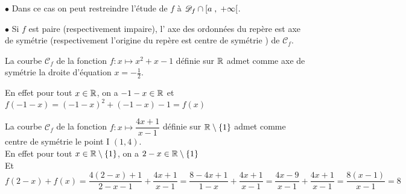 \begin{remark}

$ \bullet $  Dans ce cas on peut restreindre l'étude de $ f $  à $ \mathscr{D}_{f}\cap \left[a \;,\; +\infty\right[ $.

$ \bullet $ Si $ f $  est paire (respectivement impaire), l' axe des ordonnées du repère est  axe de symétrie (respectivement l'origine du repère est centre de symétrie ) de $  \mathscr{C}_{f}$.
\end{remark}
\begin{example}

 La  courbe  $  \mathscr{C}_{f}$ de la  fonction $ f : x\longmapsto x^{2}+x-1 $  définie sur $ \mathbb{R} $  admet comme axe de symétrie la droite d'équation $ x=-\frac{1}{2} $.
 
 En effet pour tout $ x\in\mathbb{R} $, on a $ -1-x\in\mathbb{R} $  et $ f(-1-x)= (-1-x)^{2}+(-1-x)-1=f(x) $


\end{example}

\begin{example} 

 La  courbe  $  \mathscr{C}_{f}$ de la  fonction $ f :x\longmapsto \dfrac{4x+1}{x-1} $ \;  définie sur $ \mathbb{R}\setminus \left\{1\right\} $  admet comme centre de symétrie le point  I $ (1,4) $.\\
 
 En effet pour tout $ x\in\mathbb{R}\setminus \left\{1\right\} $, on a $ 2-x\in\mathbb{R}\setminus \left\{1\right\} $ \\ Et $ f(2-x)+f(x)= \dfrac{4(2-x)+1}{2-x-1}+\dfrac{4x+1}{x-1}=\dfrac{8-4x+1}{1-x}+\dfrac{4x+1}{x-1}=\dfrac{4x-9}{x-1}+\dfrac{4x+1}{x-1}=\dfrac{8(x-1)}{x-1}=8$
\end{example}



